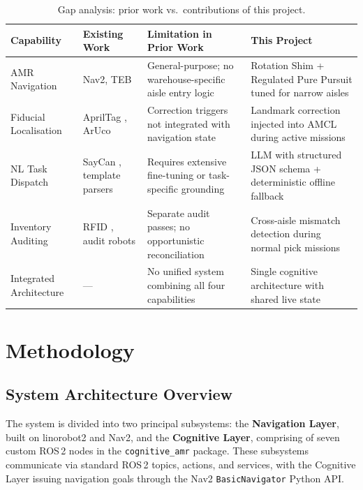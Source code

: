 \documentclass[12pt,a4paper]{report}
\begin{document}
\begin{table}[H]
\centering
\caption{Gap analysis: prior work vs.\ contributions of this project.}
\label{tab:gap}
\begin{tabular}{p{3.8cm} p{3.2cm} p{3.2cm} p{3.2cm}}
\toprule
\textbf{Capability} & \textbf{Existing Work} & \textbf{Limitation in Prior Work} & \textbf{This Project} \\
\midrule
AMR Navigation & Nav2, TEB \citep{macenski2020nav2} & General-purpose; no warehouse-specific aisle entry logic & Rotation Shim + Regulated Pure Pursuit tuned for narrow aisles \\
\midrule
Fiducial Localisation & AprilTag \citep{olson2011}, ArUco \citep{garrido2014} & Correction triggers not integrated with navigation state & Landmark correction injected into AMCL during active missions \\
\midrule
NL Task Dispatch & SayCan \citep{ahn2022}, template parsers \citep{tellex2011} & Requires extensive fine-tuning or task-specific grounding & LLM with structured JSON schema + deterministic offline fallback \\
\midrule
Inventory Auditing & RFID \citep{rfidjournal2020}, audit robots \citep{bosch2022} & Separate audit passes; no opportunistic reconciliation & Cross-aisle mismatch detection during normal pick missions \\
\midrule
Integrated Architecture & --- & No unified system combining all four capabilities & Single cognitive architecture with shared live state \\
\bottomrule
\end{tabular}
\end{table}

\chapter{Methodology}
\label{ch:methodology}

\section{System Architecture Overview}

The system is divided into two principal subsystems: the \textbf{Navigation Layer}, built on linorobot2 and Nav2, and the \textbf{Cognitive Layer}, comprising of seven custom ROS\,2 nodes in the \texttt{cognitive\_amr} package. These subsystems communicate via standard ROS\,2 topics, actions, and services, with the Cognitive Layer issuing navigation goals through the Nav2 \texttt{BasicNavigator} Python API.
\end{document}
